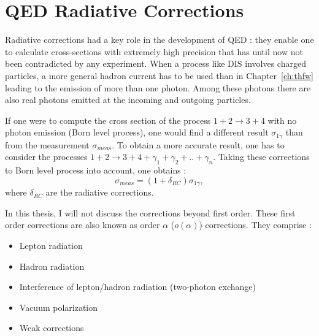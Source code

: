 
\section{QED Radiative Corrections}

Radiative corrections had a key role in the development of QED : they enable one to calculate cross-sections with extremely high precision that has until now not been contradicted by any experiment. When a process like DIS involves charged particles, a more general hadron current has to be used than in Chapter~\ref{ch:thfw} leading to the emission of more than one photon. Among these photons there are also real photons emitted at the incoming and outgoing particles.

If one were to compute the cross section of the process $1+2 \rightarrow 3+4$ with no photon emission (Born level process), one would find a different result $\sigma_{1\gamma}$ than from the measurement $\sigma_{meas}$. To obtain a more accurate result, one has to consider the processes $1+2 \rightarrow 3+4+\gamma_1+\gamma_2+..+\gamma_n$. Taking these corrections to Born level process into account, one obtains :
%
\begin{equation} \label{eq:RC}
  \sigma_{meas} = (1+\delta_{RC})\sigma_{1\gamma},
\end{equation}
%
where $\delta_{RC}$ are the radiative corrections.


In this thesis, I will not discuss the corrections beyond first order. These first order corrections are also known as order $\alpha$ ($o(\alpha)$) corrections. They comprise :
\begin{itemize}
\item Lepton radiation
\item Hadron radiation
\item Interference of lepton/hadron radiation (two-photon exchange)
\item Vacuum polarization
\item Weak corrections
\end{itemize}

